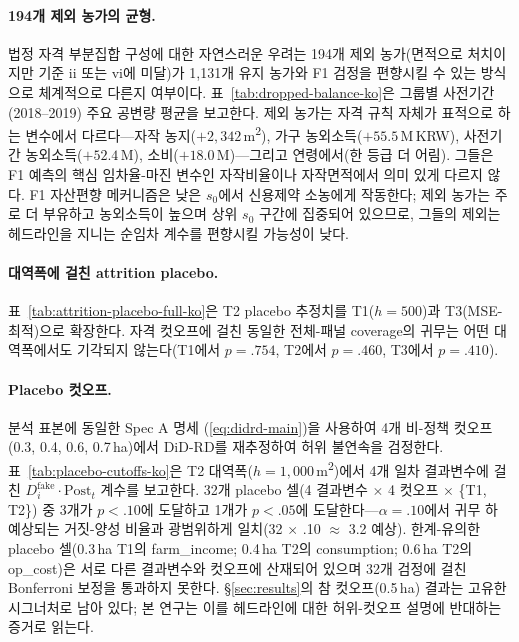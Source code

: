 \documentclass[12pt, a4paper]{article}
\begin{document}
\paragraph{194개 제외 농가의 균형.} 법정 자격 부분집합 구성에 대한 자연스러운 우려는 194개 제외 농가(면적으로 처치이지만 기준 ii 또는 vi에 미달)가 1,131개 유지 농가와 F1 검정을 편향시킬 수 있는 방식으로 체계적으로 다른지 여부이다. 표~\ref{tab:dropped-balance-ko}은 그룹별 사전기간(2018--2019) 주요 공변량 평균을 보고한다. 제외 농가는 자격 규칙 자체가 표적으로 하는 변수에서 다르다---자작 농지($+2{,}342$\,m\textsuperscript{2}), 가구 농외소득($+55.5$\,M\,KRW), 사전기간 농외소득($+52.4$\,M), 소비($+18.0$\,M)---그리고 연령에서(한 등급 더 어림). 그들은 F1 예측의 핵심 임차율-마진 변수인 자작비율이나 자작면적에서 의미 있게 다르지 않다. F1 자산편향 메커니즘은 낮은 $s_0$에서 신용제약 소농에게 작동한다; 제외 농가는 주로 더 부유하고 농외소득이 높으며 상위 $s_0$ 구간에 집중되어 있으므로, 그들의 제외는 헤드라인을 지니는 순임차 계수를 편향시킬 가능성이 낮다.



\paragraph{대역폭에 걸친 attrition placebo.} 표~\ref{tab:attrition-placebo-full-ko}은 T2 placebo 추정치를 T1($h=500$)과 T3(MSE-최적)으로 확장한다. 자격 컷오프에 걸친 동일한 전체-패널 coverage의 귀무는 어떤 대역폭에서도 기각되지 않는다(T1에서 $p = .754$, T2에서 $p = .460$, T3에서 $p = .410$).



\paragraph{Placebo 컷오프.}\label{sec:robustness-placebo} 분석 표본에 동일한 Spec A 명세 (\ref{eq:didrd-main})을 사용하여 4개 비-정책 컷오프(0.3, 0.4, 0.6, 0.7\,ha)에서 DiD-RD를 재추정하여 허위 불연속을 검정한다. 표~\ref{tab:placebo-cutoffs-ko}은 T2 대역폭($h = 1{,}000$\,m\textsuperscript{2})에서 4개 일차 결과변수에 걸친 $D^{\text{fake}}_i \cdot \text{Post}_t$ 계수를 보고한다. 32개 placebo 셀(4 결과변수 $\times$ 4 컷오프 $\times$ \{T1, T2\}) 중 3개가 $p < .10$에 도달하고 1개가 $p < .05$에 도달한다---$\alpha = .10$에서 귀무 하 예상되는 거짓-양성 비율과 광범위하게 일치(32 $\times$ .10 $\approx$ 3.2 예상). 한계-유의한 placebo 셀(0.3\,ha T1의 farm\_income; 0.4\,ha T2의 consumption; 0.6\,ha T2의 op\_cost)은 서로 다른 결과변수와 컷오프에 산재되어 있으며 32개 검정에 걸친 Bonferroni 보정을 통과하지 못한다. \S\ref{sec:results}의 참 컷오프(0.5\,ha) 결과는 고유한 시그너처로 남아 있다; 본 연구는 이를 헤드라인에 대한 허위-컷오프 설명에 반대하는 증거로 읽는다.
\end{document}
